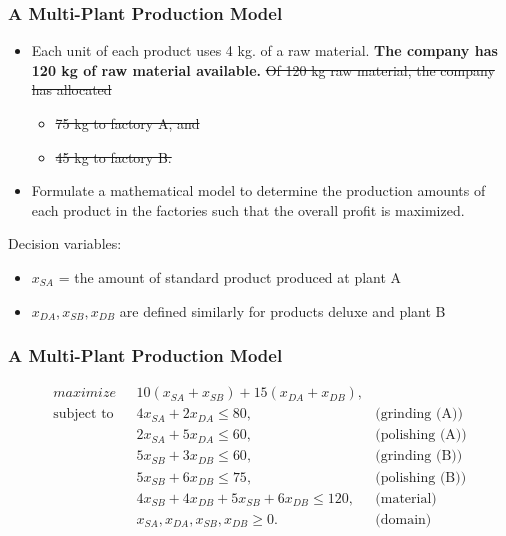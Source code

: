 \documentclass[11pt]{beamer}
\begin{document}
\begin{frame}
\frametitle{A Multi-Plant Production Model}
\begin{itemize}
\item Each unit of each product uses 4 kg. of a raw material. \textbf{The company has 120 kg of raw material available.} \sout{Of 120 kg raw material, the company has allocated}
\begin{itemize}
\item \sout{75 kg to factory A, and}
\item \sout{45 kg  to factory B.}
\end{itemize}
\item Formulate a mathematical model to determine the production amounts of each product in the factories such that the overall profit is maximized.
\end{itemize}

Decision variables:
\begin{itemize}
\item $x_{SA}$ = the amount of standard product produced at plant A
\item $x_{DA}, x_{SB}, x_{DB}$ are defined similarly for products deluxe and plant B
\end{itemize}
\end{frame}

\begin{frame}
\frametitle{A Multi-Plant Production Model}


\pause
\begin{align}
\displaystyle maximize \mbox{ } & 10(x_{SA} + x_{SB}) + 15(x_{DA} + x_{DB}), \label{multi3:objective} \\
% 
\mbox{subject to }& 4x_{SA} + 2x_{DA} \leq 80, & \mbox{(grinding (A))}  \label{multi3:grinding}\\
& 2x_{SA} + 5x_{DA} \leq 60, & \mbox{(polishing (A))}  \label{multi3:polishing}\\
& 5x_{SB} + 3x_{DB} \leq 60, & \mbox{(grinding (B))}  \label{multi3:grinding1}\\
& 5x_{SB} + 6x_{DB} \leq 75, & \mbox{(polishing (B))}  \label{multi3:polishing1}\\
& 4x_{SB} + 4x_{DB} +5x_{SB} + 6x_{DB} \leq 120, & \mbox{(material)}  \label{multi3:material1}\\
& x_{SA}, x_{DA}, x_{SB}, x_{DB} \geq 0. & \mbox{(domain)} \label{multi3:domain}
\end{align}
\end{frame}
\end{document}

